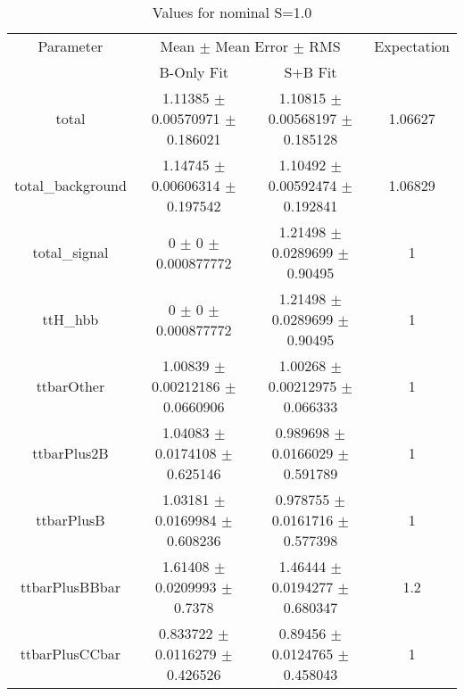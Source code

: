 \begin{table}
\centering
\caption{Values for nominal S=1.0}
\begin{tabular}{cccc}
\toprule
Parameter & \multicolumn{2}{c}{Mean $\pm$ Mean Error $\pm$ RMS} & Expectation\\
 & B-Only Fit & S+B Fit & \\
\midrule
total & \num{1.11385} $\pm$ \num{0.00570971} $\pm$ \num{0.186021} & \num{1.10815} $\pm$ \num{0.00568197} $\pm$ \num{0.185128} & \num{1.06627}\\
total\_background & \num{1.14745} $\pm$ \num{0.00606314} $\pm$ \num{0.197542} & \num{1.10492} $\pm$ \num{0.00592474} $\pm$ \num{0.192841} & \num{1.06829}\\
total\_signal & \num{0} $\pm$ \num{0} $\pm$ \num{0.000877772} & \num{1.21498} $\pm$ \num{0.0289699} $\pm$ \num{0.90495} & \num{1}\\
ttH\_hbb & \num{0} $\pm$ \num{0} $\pm$ \num{0.000877772} & \num{1.21498} $\pm$ \num{0.0289699} $\pm$ \num{0.90495} & \num{1}\\
ttbarOther & \num{1.00839} $\pm$ \num{0.00212186} $\pm$ \num{0.0660906} & \num{1.00268} $\pm$ \num{0.00212975} $\pm$ \num{0.066333} & \num{1}\\
ttbarPlus2B & \num{1.04083} $\pm$ \num{0.0174108} $\pm$ \num{0.625146} & \num{0.989698} $\pm$ \num{0.0166029} $\pm$ \num{0.591789} & \num{1}\\
ttbarPlusB & \num{1.03181} $\pm$ \num{0.0169984} $\pm$ \num{0.608236} & \num{0.978755} $\pm$ \num{0.0161716} $\pm$ \num{0.577398} & \num{1}\\
ttbarPlusBBbar & \num{1.61408} $\pm$ \num{0.0209993} $\pm$ \num{0.7378} & \num{1.46444} $\pm$ \num{0.0194277} $\pm$ \num{0.680347} & \num{1.2}\\
ttbarPlusCCbar & \num{0.833722} $\pm$ \num{0.0116279} $\pm$ \num{0.426526} & \num{0.89456} $\pm$ \num{0.0124765} $\pm$ \num{0.458043} & \num{1}\\
\bottomrule
\end{tabular}
\end{table}